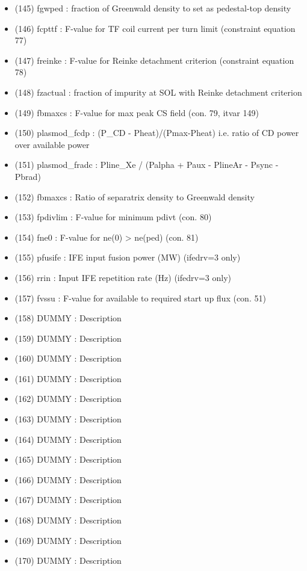 \documentclass[]{article}
\begin{document}
\begin{itemize}
\begin{itemize}
  \item
    (145) fgwped : fraction of Greenwald density to set as pedestal-top
    density
  \item
    (146) fcpttf : F-value for TF coil current per turn limit
    (constraint equation 77)
  \item
    (147) freinke : F-value for Reinke detachment criterion (constraint
    equation 78)
  \item
    (148) fzactual : fraction of impurity at SOL with Reinke detachment
    criterion
  \item
    (149) fbmaxcs : F-value for max peak CS field (con. 79, itvar 149)
  \item
    (150) plasmod\_fcdp : (P\_CD - Pheat)/(Pmax-Pheat) i.e. ratio of CD
    power over available power
  \item
    (151) plasmod\_fradc : Pline\_Xe / (Palpha + Paux - PlineAr - Psync
    - Pbrad)
  \item
    (152) fbmaxcs : Ratio of separatrix density to Greenwald density
  \item
    (153) fpdivlim : F-value for minimum pdivt (con. 80)
  \item
    (154) fne0 : F-value for ne(0) \textgreater{} ne(ped) (con. 81)
  \item
    (155) pfusife : IFE input fusion power (MW) (ifedrv=3 only)
  \item
    (156) rrin : Input IFE repetition rate (Hz) (ifedrv=3 only)
  \item
    (157) fvssu : F-value for available to required start up flux (con.
    51)
  \item
    (158) DUMMY : Description
  \item
    (159) DUMMY : Description
  \item
    (160) DUMMY : Description
  \item
    (161) DUMMY : Description
  \item
    (162) DUMMY : Description
  \item
    (163) DUMMY : Description
  \item
    (164) DUMMY : Description
  \item
    (165) DUMMY : Description
  \item
    (166) DUMMY : Description
  \item
    (167) DUMMY : Description
  \item
    (168) DUMMY : Description
  \item
    (169) DUMMY : Description
  \item
    (170) DUMMY : Description
  \end{itemize}
\end{itemize}
\end{document}
